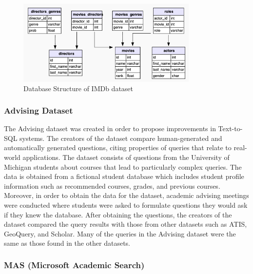 \begin{figure}[htb]
    \centering
    \includegraphics[width=0.8\textwidth]{pics/db/IMDb.png}
    \caption{Database Structure of IMDb dataset}
    \label{fig:IMDb}
\end{figure}


\subsubsection{Advising Dataset}

The Advising dataset\cite{finegan-dollak-etal-2018-improving} was created in order to propose improvements in Text-to-SQL systems. The creators of the dataset compare human-generated and automatically generated questions, citing properties of queries that relate to real-world applications. The dataset consists of questions from the University of Michigan students about courses that lead to particularly complex queries. The data is obtained from a fictional student database which includes student profile information such as recommended courses, grades, and previous courses. Moreover, in order to obtain the data for the dataset, academic advising meetings were conducted where students were asked to formulate questions they would ask if they knew the database. After obtaining the questions, the creators of the dataset compared the query results with those from other datasets such as ATIS, GeoQuery, and Scholar. Many of the queries in the Advising dataset were the same as those found in the other datasets.


\subsubsection{MAS (Microsoft Academic Search)}

